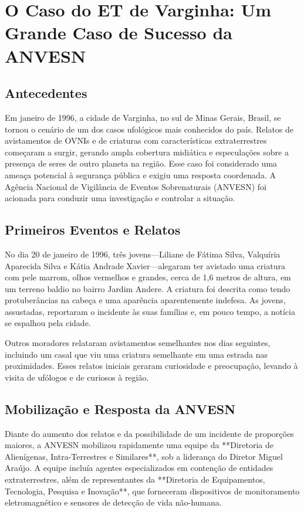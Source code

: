 \chapter{O Caso do ET de Varginha: Um Grande Caso de Sucesso da ANVESN}

\section{ Antecedentes}

Em janeiro de 1996, a cidade de Varginha, no sul de Minas Gerais, Brasil, se tornou o cenário de um dos casos ufológicos mais conhecidos do país. Relatos de avistamentos de OVNIs e de criaturas com características extraterrestres começaram a surgir, gerando ampla cobertura midiática e especulações sobre a presença de seres de outro planeta na região. Esse caso foi considerado uma ameaça potencial à segurança pública e exigiu uma resposta coordenada. A Agência Nacional de Vigilância de Eventos Sobrenaturais (ANVESN) foi acionada para conduzir uma investigação e controlar a situação.

\section{ Primeiros Eventos e Relatos}

No dia 20 de janeiro de 1996, três jovens—Liliane de Fátima Silva, Valquíria Aparecida Silva e Kátia Andrade Xavier—alegaram ter avistado uma criatura com pele marrom, olhos vermelhos e grandes, cerca de 1,6 metros de altura, em um terreno baldio no bairro Jardim Andere. A criatura foi descrita como tendo protuberâncias na cabeça e uma aparência aparentemente indefesa. As jovens, assustadas, reportaram o incidente às suas famílias e, em pouco tempo, a notícia se espalhou pela cidade.

Outros moradores relataram avistamentos semelhantes nos dias seguintes, incluindo um casal que viu uma criatura semelhante em uma estrada nas proximidades. Esses relatos iniciais geraram curiosidade e preocupação, levando à visita de ufólogos e de curiosos à região. 

\section{ Mobilização e Resposta da ANVESN}

Diante do aumento dos relatos e da possibilidade de um incidente de proporções maiores, a ANVESN mobilizou rapidamente uma equipe da **Diretoria de Alienígenas, Intra-Terrestres e Similares**, sob a liderança do Diretor Miguel Araújo. A equipe incluía agentes especializados em contenção de entidades extraterrestres, além de representantes da **Diretoria de Equipamentos, Tecnologia, Pesquisa e Inovação**, que forneceram dispositivos de monitoramento eletromagnético e sensores de detecção de vida não-humana.

